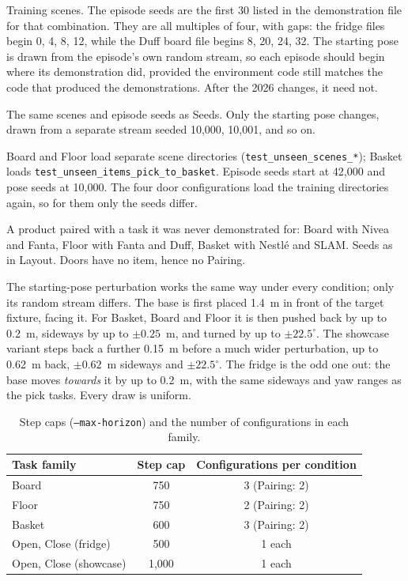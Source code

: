 \begin{description}[leftmargin=2em,style=nextline,itemsep=0.25em]
\item[Seeds (12 configurations)] Training scenes. The episode seeds are the first 30 listed in the demonstration file for that combination. They are all multiples of four, with gaps: the fridge files begin 0, 4, 8, 12, while the Duff board file begins 8, 20, 24, 32. The starting pose is drawn from the episode's own random stream, so each episode should begin where its demonstration did, provided the environment code still matches the code that produced the demonstrations. After the 2026 changes, it need not.
\item[Pose (12)] The same scenes and episode seeds as Seeds. Only the starting pose changes, drawn from a separate stream seeded 10,000, 10,001, and so on.
\item[Layout (12)] Board and Floor load separate scene directories (\texttt{test\_unseen\_scenes\_*}); Basket loads \texttt{test\_unseen\_items\_pick\_to\_basket}. Episode seeds start at 42,000 and pose seeds at 10,000. The four door configurations load the training directories again, so for them only the seeds differ.
\item[Pairing (6)] A product paired with a task it was never demonstrated for: Board with Nivea and Fanta, Floor with Fanta and Duff, Basket with Nestl\'e and SLAM. Seeds as in Layout. Doors have no item, hence no Pairing.
\end{description}

The starting-pose perturbation works the same way under every condition; only its random stream differs. The base is first placed 1.4~m in front of the target fixture, facing it. For Basket, Board and Floor it is then pushed back by up to 0.2~m, sideways by up to $\pm0.25$~m, and turned by up to $\pm22.5^{\circ}$. The showcase variant steps back a further 0.15~m before a much wider perturbation, up to 0.62~m back, $\pm0.62$~m sideways and $\pm22.5^{\circ}$. The fridge is the odd one out: the base moves \emph{towards} it by up to 0.2~m, with the same sideways and yaw ranges as the pick tasks. Every draw is uniform.

{\renewcommand{\arraystretch}{1.12}
\begin{table}[H]
\centering
\small
\begin{tabular}{lcc}
\toprule
Task family & Step cap & Configurations per condition \\
\midrule
Board & 750 & 3 (Pairing: 2) \\
Floor & 750 & 2 (Pairing: 2) \\
Basket & 600 & 3 (Pairing: 2) \\
Open, Close (fridge) & 500 & 1 each \\
Open, Close (showcase) & 1,000 & 1 each \\
\bottomrule
\end{tabular}
\caption{Step caps (\texttt{--max-horizon}) and the number of configurations in each family.}
\label{tab:caps}
\end{table}}


